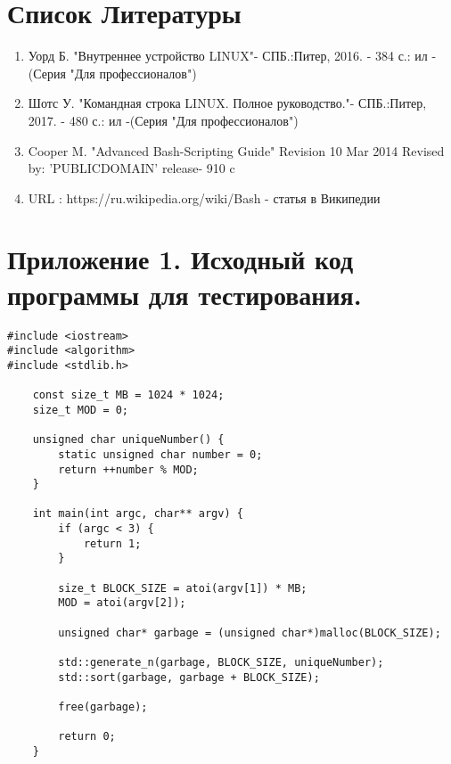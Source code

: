 \documentclass{article}
\begin{document}
\section{Список Литературы}
\begin{enumerate}
\item Уорд Б. "Внутреннее устройство LINUX"- СПБ.:Питер, 2016. - 384 с.: ил -(Серия "Для профессионалов")
\item Шотс У. "Командная строка LINUX. Полное руководство."- СПБ.:Питер, 2017. - 480 с.: ил -(Серия "Для профессионалов")
\item Cooper M. "Advanced Bash-Scripting Guide" Revision 10 Mar 2014 Revised by: 'PUBLICDOMAIN' release- 910 c
\item URL : https://ru.wikipedia.org/wiki/Bash - статья в Википедии
\end{enumerate}


\newpage 
\section{Приложение 1. Исходный код программы для тестирования.}
\begin{lstlisting}
#include <iostream>
#include <algorithm>
#include <stdlib.h>

    const size_t MB = 1024 * 1024;
    size_t MOD = 0;

    unsigned char uniqueNumber() {
        static unsigned char number = 0;
        return ++number % MOD;
    }

    int main(int argc, char** argv) {
        if (argc < 3) {
            return 1;
        }

        size_t BLOCK_SIZE = atoi(argv[1]) * MB;
        MOD = atoi(argv[2]);

        unsigned char* garbage = (unsigned char*)malloc(BLOCK_SIZE);

        std::generate_n(garbage, BLOCK_SIZE, uniqueNumber);
        std::sort(garbage, garbage + BLOCK_SIZE);

        free(garbage);

        return 0;
    }
\end{lstlisting}

\newpage 
\end{document}
